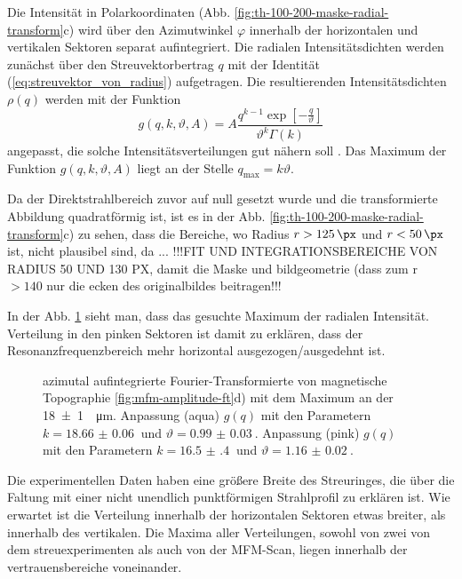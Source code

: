 \noindent
Die Intensität in Polarkoordinaten (Abb. \ref{fig:th-100-200-maske-radial-transform}c) wird über den Azimutwinkel $\varphi$ innerhalb der horizontalen und vertikalen Sektoren separat aufintegriert. Die radialen Intensitätsdichten werden zunächst über den Streuvektorbertrag $q$ mit der Identität (\ref{eq:streuvektor_von_radius}) aufgetragen. Die resultierenden Intensitätsdichten $\rho(q)$ werden mit der Funktion
\begin{equation}
    g(q, k, \vartheta, A) = A\frac{q^{k-1}\exp\left[-\frac{q}{\vartheta}\right]}{\vartheta^k\Gamma(k)}
\end{equation}
angepasst, die solche Intensitätsverteilungen gut nähern soll \cite[Kap. 5]{bagschik_employing_2016}. Das Maximum der Funktion $g(q, k, \vartheta, A)$ liegt an der Stelle $q_\text{max} = k\vartheta$.

\noindent
Da der Direktstrahlbereich zuvor auf null gesetzt wurde und die transformierte Abbildung quadratförmig ist, ist es in der Abb. \ref{fig:th-100-200-maske-radial-transform}c) zu sehen, dass die Bereiche, wo Radius $r > \SI{125}{\px}$ und $r< \SI{50}{\px}$ ist, nicht plausibel sind, da ...
!!!FIT UND INTEGRATIONSBEREICHE VON RADIUS 50 UND 130 PX, damit die Maske und bildgeometrie (dass zum r $> 140$ nur die ecken des originalbildes beitragen!!!


\noindent
In der Abb. \ref{fig:radius_fit} sieht man, dass das gesuchte Maximum der radialen Intensität. Verteilung in den pinken Sektoren ist damit zu erklären, dass der Resonanzfrequenzbereich mehr horizontal ausgezogen/ausgedehnt ist.
\begin{figure}[H]
    \centering
    
    \caption{azimutal aufintegrierte Fourier-Transformierte von magnetische Topographie  \ref{fig:mfm-amplitude-ft}d) mit dem Maximum  an der \SI{18(1)}{\per\micro\meter}. Anpassung (aqua) $g(q)$ mit den Parametern $k = \SI{18.66(6)}{}$ und $\vartheta = \SI{0.99(3)}{}$. Anpassung (pink) $g(q)$ mit den Parametern $k = \SI{16.5(4)}{}$ und $\vartheta = \SI{1.16(2)}{}$.}
    \label{fig:radius_fit}
\end{figure}
\noindent
Die experimentellen Daten haben eine größere Breite des Streuringes, die über die Faltung mit einer nicht unendlich punktförmigen Strahlprofil zu erklären ist. Wie erwartet ist die Verteilung innerhalb der horizontalen Sektoren etwas breiter, als innerhalb des vertikalen. Die Maxima aller Verteilungen, sowohl von zwei von dem streuexperimenten als auch von der MFM-Scan, liegen innerhalb der vertrauensbereiche voneinander.


